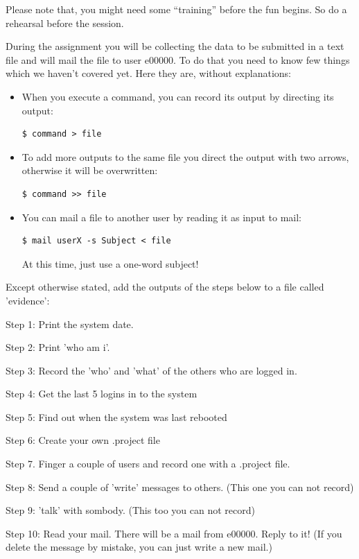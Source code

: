\documentclass[11pt,a4paper,twoside]{article}
\begin{document}
Please note that, you might need some ``training'' before the fun begins. So
do a rehearsal before the session.

During the assignment you will be collecting the data to be submitted in a
text file and will mail the file to user e00000. To do that you need to know
few things which we haven't covered yet. Here they are, without explanations:
\begin{itemize}
\item When you execute a command, you can record its output by directing its
output:
\begin{lstlisting}[frame=single]
$ command > file
\end{lstlisting}

\item To add more outputs to the same file you direct the output with two arrows,
otherwise it will be overwritten:
\begin{lstlisting}[frame=single]
$ command >> file
\end{lstlisting}

\item You can mail a file to another user by reading it as input to mail:
\begin{lstlisting}[frame=single]
$ mail userX -s Subject < file
\end{lstlisting}

At this time, just use a one-word subject!

\end{itemize}

Except otherwise stated, add the outputs of the steps below to a file
called 'evidence':

Step 1: Print the system date.

Step 2: Print 'who am i'.

Step 3: Record the 'who' and 'what' of the others who are logged in.

Step 4: Get the last 5 logins in to the system

Step 5: Find out when the system was last rebooted

Step 6: Create your own .project file

Step 7. Finger a couple of users and record one with a .project file.

Step 8: Send a couple of 'write' messages to others. (This one you can not record)

Step 9: 'talk' with sombody. (This too you can not record)

Step 10: Read your mail. There will be a mail from e00000. Reply to it!
(If you delete the message by mistake, you can just write a new mail.)
\end{document}
